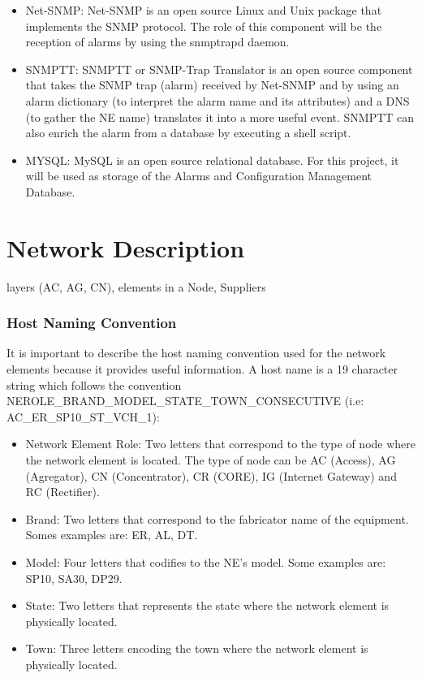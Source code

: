 \documentclass[10pt,a4paper]{report}
\begin{document}
\begin{itemize}
  \item Net-SNMP: Net-SNMP is an open source Linux and Unix package that implements the SNMP protocol. The role of this component will be the reception of alarms by using the snmptrapd daemon\cite{netsnmp}.
  \item SNMPTT: SNMPTT or SNMP-Trap Translator is an open source component that takes the SNMP trap (alarm) received by Net-SNMP and by using an alarm dictionary (to interpret the alarm name and its attributes) and a DNS (to gather the NE name) translates it into a more useful event. SNMPTT can also enrich the alarm from a database by executing a shell script.\cite{snmptt}
  \item MYSQL: MySQL is an open source relational database. For this project, it will be used as storage of the Alarms and Configuration Management Database\cite{mysql}.
\end{itemize}

\chapter{Network Description}
 layers (AC, AG, CN), elements in a Node, Suppliers
\subsection{Host Naming Convention}
It is important to describe the host naming convention used for the network elements because it provides useful information. A host name is a 19 character string which follows the convention NEROLE\_BRAND\_MODEL\_STATE\_TOWN\_CONSECUTIVE (i.e: AC\_ER\_SP10\_ST\_VCH\_1):

\begin{itemize}
   \item Network Element Role: Two letters that correspond to the type of node where the network element is located. The type of node can be AC (Access), AG (Agregator), CN (Concentrator), CR (CORE), IG (Internet Gateway) and RC (Rectifier).
   \item Brand: Two letters that correspond to the fabricator name of the equipment. Somes examples are: ER, AL, DT.
   \item Model: Four letters that codifies to the NE's model. Some examples are: SP10, SA30, DP29.
   \item State: Two letters that represents the state where the network element is physically located.
   \item Town: Three letters encoding the town where the network element is physically located.
\end{itemize}
\end{document}
